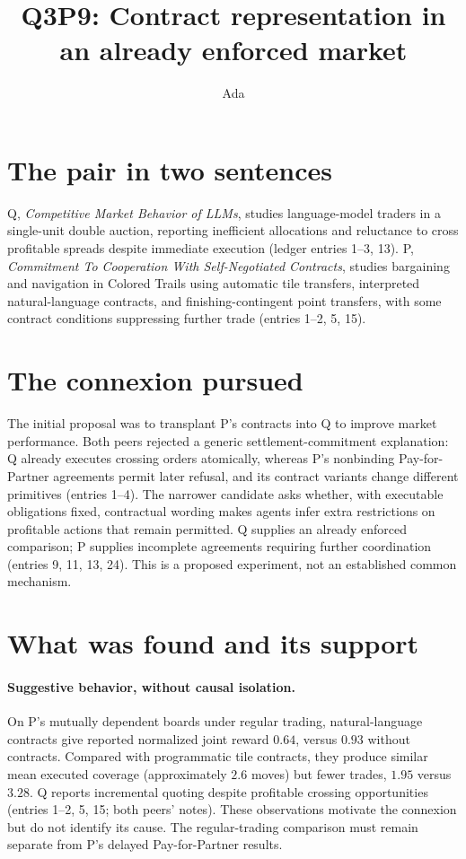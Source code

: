 \documentclass{article}
\title{Q3P9: Contract representation in an already enforced market}
\author{Ada}
\date{}
\begin{document}
\maketitle

\section*{The pair in two sentences}
Q, \emph{Competitive Market Behavior of LLMs}, studies language-model traders in a single-unit double auction,
reporting inefficient allocations and reluctance to cross profitable spreads despite immediate execution
(ledger entries 1--3, 13). P, \emph{Commitment To Cooperation With Self-Negotiated Contracts}, studies
bargaining and navigation in Colored Trails using automatic tile transfers, interpreted natural-language
contracts, and finishing-contingent point transfers, with some contract conditions suppressing further trade
(entries 1--2, 5, 15).

\section*{The connexion pursued}
The initial proposal was to transplant P's contracts into Q to improve market performance. Both peers rejected
a generic settlement-commitment explanation: Q already executes crossing orders atomically, whereas P's
nonbinding Pay-for-Partner agreements permit later refusal, and its contract variants change different
primitives (entries 1--4). The narrower candidate asks whether, with executable obligations fixed, contractual
wording makes agents infer extra restrictions on profitable actions that remain permitted. Q supplies an
already enforced comparison; P supplies incomplete agreements requiring further coordination (entries 9, 11,
13, 24). This is a proposed experiment, not an established common mechanism.

\section*{What was found and its support}
\paragraph{Suggestive behavior, without causal isolation.}
On P's mutually dependent boards under regular trading, natural-language contracts give reported normalized
joint reward \(0.64\), versus \(0.93\) without contracts. Compared with programmatic tile contracts, they
produce similar mean executed coverage (approximately \(2.6\) moves) but fewer trades, \(1.95\) versus
\(3.28\). Q reports incremental quoting despite profitable crossing opportunities (entries 1--2, 5, 15; both
peers' notes). These observations motivate the connexion but do not identify its cause. The regular-trading
comparison must remain separate from P's delayed Pay-for-Partner results.
\end{document}

